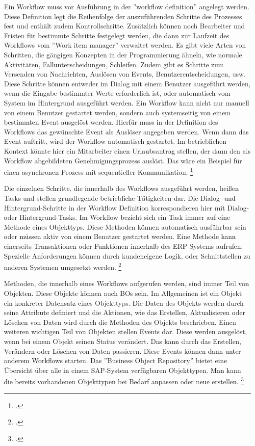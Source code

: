 Ein Workflow muss vor Ausführung in der ''workflow definition'' angelegt werden. Diese Definition legt die Reihenfolge der auszuführenden Schritte des Prozesses fest und enthält zudem Kontrollschritte. Zusätzlich können noch Bearbeiter und Fristen für bestimmte Schritte festgelegt werden, die dann zur Laufzeit des Workflows vom ''Work item manager'' verwaltet werden. Es gibt viele Arten von Schritten, die gängigen Konzepten in der Programmierung ähneln, wie \zB normale Aktivitäten, Fallunterscheidungen, Schleifen. Zudem gibt es Schritte zum Versenden von Nachrichten, Auslösen von Events, Benutzerentscheidungen, usw. Diese Schritte können entweder im Dialog mit einem Benutzer ausgeführt werden, wenn \zB die Eingabe bestimmter Werte erforderlich ist, oder automatisch vom System im Hintergrund ausgeführt werden. Ein Workflow kann nicht nur manuell von einem Benutzer gestartet werden, sondern auch systemseitig von einem bestimmten Event ausgelöst werden. Hierfür muss in der Definition des Workflows das gewünschte Event als Auslöser angegeben werden. Wenn dann das Event auftritt, wird der Workflow automatisch gestartet. Im betrieblichen Kontext könnte hier \zB ein Mitarbeiter einen Urlaubsantrag stellen, der dann den als Workflow abgebildeten Genehmigungsprozess auslöst. Das wäre ein Beispiel für einen asynchronen Prozess mit sequentieller Kommunikation. \footcite[Vgl.][]{sap_business-workflows_2022-1}

Die einzelnen Schritte, die innerhalb des Workflows ausgeführt werden, hei{\ss}en Tasks und stellen grundlegende betriebliche Tätigkeiten dar. Die Dialog- und Hintergrund-Schritte in der Workflow Definition korrespondieren hier mit Dialog- oder Hintergrund-Tasks. Im Workflow bezieht sich ein Task immer auf eine Methode eines Objekttyps. Diese Methoden können automatisch ausführbar sein oder müssen aktiv von einem Benutzer gestartet werden. Eine Methode kann einerseits Transaktionen oder Funktionen innerhalb des ERP-Systems aufrufen. Spezielle Anforderungen können durch kundeneigene Logik, oder Schnittstellen zu anderen Systemen umgesetzt werden. \footcite[Vgl.][]{sap_business-workflows_2022-1}

Methoden, die innerhalb eines Workflows aufgerufen werden, sind immer Teil von Objekten. Diese Objekte können auch BOs sein. Im Allgemeinen ist ein Objekt ein konkreter Datensatz eines Objekttyps. Die Daten des Objekts werden durch seine Attribute definiert und die Aktionen, wie das Erstellen, Aktualisieren oder Löschen von Daten wird durch die Methoden des Objekts beschrieben. Einen weiteren wichtigen Teil von Objekten stellen Events dar. Diese werden ausgelöst, wenn bei einem Objekt seinen Status verändert. Das kann \zB durch das Erstellen, Verändern oder Löschen von Daten passieren. Diese Events können dann unter anderem Workflows starten. Das ''Business Object Repository'' bietet eine Übersicht über alle in einem SAP-System verfügbaren Objekttypen. Man kann die bereits vorhandenen Objekttypen bei Bedarf anpassen oder neue erstellen. \footcite[Vgl.][]{sap_business-workflows_2022-1}

